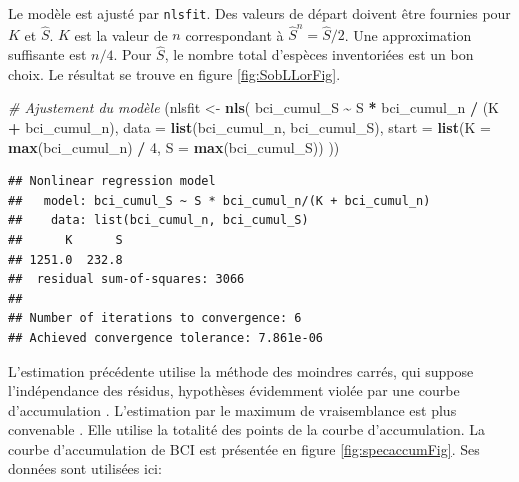 \documentclass[
  11pt,
  american,
  a4paper,
  extrafontsizes,onecolumn,openright
  ]{memoir}
\newenvironment{Shaded}{\begin{snugshade}}{\end{snugshade}}
\newcommand{\AttributeTok}[1]{\textcolor[rgb]{0.13,0.29,0.53}{#1}}
\newcommand{\CommentTok}[1]{\textcolor[rgb]{0.56,0.35,0.01}{\textit{#1}}}
\newcommand{\DecValTok}[1]{\textcolor[rgb]{0.00,0.00,0.81}{#1}}
\newcommand{\FunctionTok}[1]{\textcolor[rgb]{0.13,0.29,0.53}{\textbf{#1}}}
\newcommand{\NormalTok}[1]{#1}
\newcommand{\OtherTok}[1]{\textcolor[rgb]{0.56,0.35,0.01}{#1}}
\newcommand{\SpecialCharTok}[1]{\textcolor[rgb]{0.81,0.36,0.00}{\textbf{#1}}}
\begin{document}
\normalsize

Le modèle est ajusté par \texttt{nlsfit}.
Des valeurs de départ doivent être fournies pour \(K\) et \(\hat{S}\).
\(K\) est la valeur de \(n\) correspondant à \(\hat{S}^{n} = \hat{S} / 2\).
Une approximation suffisante est \(n / 4\).
Pour \(\hat{S}\), le nombre total d'espèces inventoriées est un bon choix.
Le résultat se trouve en figure \ref{fig:SobLLorFig}.

\scriptsize

\begin{Shaded}
\begin{Highlighting}[]
\CommentTok{\# Ajustement du modèle}
\NormalTok{(nlsfit }\OtherTok{\textless{}{-}} \FunctionTok{nls}\NormalTok{(}
\NormalTok{  bci\_cumul\_S }\SpecialCharTok{\textasciitilde{}}\NormalTok{ S }\SpecialCharTok{*}\NormalTok{ bci\_cumul\_n }\SpecialCharTok{/}\NormalTok{ (K }\SpecialCharTok{+}\NormalTok{ bci\_cumul\_n), }
  \AttributeTok{data =} \FunctionTok{list}\NormalTok{(bci\_cumul\_n, bci\_cumul\_S), }
  \AttributeTok{start =} \FunctionTok{list}\NormalTok{(}\AttributeTok{K =} \FunctionTok{max}\NormalTok{(bci\_cumul\_n) }\SpecialCharTok{/} \DecValTok{4}\NormalTok{, }\AttributeTok{S =} \FunctionTok{max}\NormalTok{(bci\_cumul\_S))}
\NormalTok{))}
\end{Highlighting}
\end{Shaded}

\begin{verbatim}
## Nonlinear regression model
##   model: bci_cumul_S ~ S * bci_cumul_n/(K + bci_cumul_n)
##    data: list(bci_cumul_n, bci_cumul_S)
##      K      S 
## 1251.0  232.8 
##  residual sum-of-squares: 3066
## 
## Number of iterations to convergence: 6 
## Achieved convergence tolerance: 7.861e-06
\end{verbatim}

\normalsize

L'estimation précédente utilise la méthode des moindres carrés, qui suppose l'indépendance des résidus, hypothèses évidemment violée par une courbe d'accumulation \autocite{Colwell1994}.
L'estimation par le maximum de vraisemblance est plus convenable \autocite{Raaijmakers1987}.
Elle utilise la totalité des points de la courbe d'accumulation.
La courbe d'accumulation de BCI est présentée en figure \ref{fig:specaccumFig}.
Ses données sont utilisées ici:

\scriptsize
\end{document}

